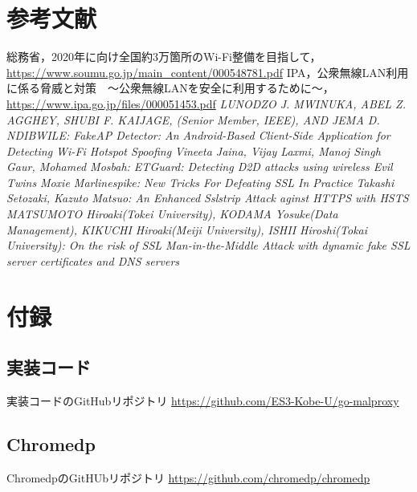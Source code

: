 \documentclass[dvipdfmx,twocolumn]{jsarticle}
\begin{document}
    \section{参考文献}
        \begin{thebibliography}{9}
             総務省，2020年に向け全国約3万箇所のWi-Fi整備を目指して，\url{https://www.soumu.go.jp/main_content/000548781.pdf}
             IPA，公衆無線LAN利用に係る脅威と対策　～公衆無線LANを安全に利用するために～，\url{https://www.ipa.go.jp/files/000051453.pdf}
             \textit{LUNODZO J. MWINUKA, ABEL Z. AGGHEY, SHUBI F. KAIJAGE, (Senior Member, IEEE), AND JEMA D. NDIBWILE: FakeAP Detector: An Android-Based Client-Side Application for Detecting Wi-Fi Hotspot Spoofing}
             \textit{Vineeta Jaina, Vijay Laxmi, Manoj Singh Gaur, Mohamed Mosbah: ETGuard: Detecting D2D attacks using wireless Evil Twins}
             \textit{Moxie Marlinespike: New Tricks For Defeating SSL In Practice}
             \textit{Takashi Setozaki, Kazuto Matsuo: An Enhanced Sslstrip Attack aginst HTTPS with HSTS}
             \textit{MATSUMOTO Hiroaki(Tokei University), KODAMA Yosuke(Data Management), KIKUCHI Hiroaki(Meiji University), ISHII Hiroshi(Tokai University): On the risk of SSL Man-in-the-Middle Attack with dynamic fake SSL server certificates and DNS servers}
        \end{thebibliography}
        
    \section{付録}
        \subsection{実装コード}
            実装コードのGitHubリポジトリ \url{https://github.com/ES3-Kobe-U/go-malproxy}
        \subsection{Chromedp}
            ChromedpのGitHUbリポジトリ \url{https://github.com/chromedp/chromedp}
\end{document}
